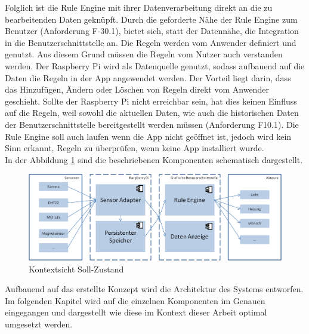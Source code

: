 Folglich ist die Rule Engine mit ihrer Datenverarbeitung \cite{Hayes-Roth:1985:RS:4284.4286} direkt an die zu bearbeitenden Daten geknüpft. Durch die geforderte Nähe der Rule Engine zum Benutzer (Anforderung F-30.1), bietet sich, statt der Datennähe, die Integration in die Benutzerschnittstelle an. Die Regeln werden vom Anwender definiert und genutzt. Aus diesem Grund müssen die Regeln vom Nutzer auch verstanden werden. Der Raspberry Pi wird als Datenquelle genutzt, sodass aufbauend auf die Daten die Regeln in der App angewendet werden. Der Vorteil liegt darin, dass das Hinzufügen, Ändern oder Löschen von Regeln direkt vom Anwender geschieht. Sollte der Raspberry Pi nicht erreichbar sein, hat dies keinen Einfluss auf die Regeln, weil sowohl die aktuellen Daten, wie auch die historischen Daten der Benutzerschnittstelle bereitgestellt werden müssen (Anforderung F10.1). Die Rule Engine soll auch laufen wenn die App nicht geöffnet ist, jedoch wird kein Sinn erkannt, Regeln zu überprüfen, wenn keine App installiert wurde.\\
In der Abbildung \ref{fig:M1} sind die beschriebenen Komponenten schematisch dargestellt.\\
\begin{figure}
	\centering
	\includegraphics[width=1\textwidth]{images/Konzept_allgemein.png}
	\caption{Kontextsicht Soll-Zustand}
	\label{fig:M1}
\end{figure}
Aufbauend auf das erstellte Konzept wird die Architektur des Systems entworfen. Im folgenden Kapitel wird auf die einzelnen Komponenten im Genauen eingegangen und dargestellt wie diese im Kontext dieser Arbeit optimal umgesetzt werden. 